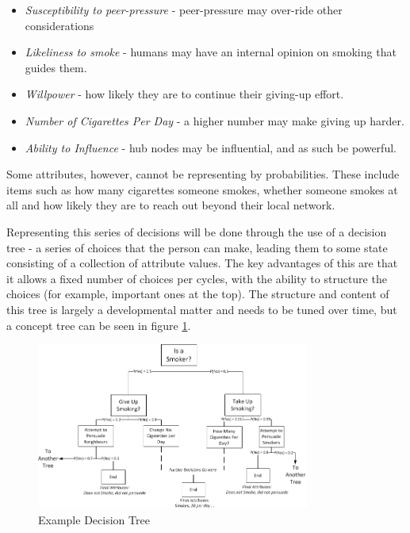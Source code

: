\documentclass[]{article}
\begin{document}
\begin{itemize}
\item \emph{Susceptibility to peer-pressure} - peer-pressure may over-ride other considerations
\item \emph{Likeliness to smoke} - humans may have an internal opinion on smoking that guides them.
\item \emph{Willpower} - how likely they are to continue their giving-up effort.
\item \emph{Number of Cigarettes Per Day} - a higher number may make giving up harder.
\item \emph{Ability to Influence} - hub nodes may be influential, and as such be powerful.
\end{itemize}

Some attributes, however, cannot be representing by probabilities. These include items such as how many cigarettes someone smokes, whether someone smokes at all and how likely they are to reach out beyond their local network.

Representing this series of decisions will be done through the use of a decision tree - a series of choices that the person can make, leading them to some state consisting of a collection of attribute values. The key advantages of this are that it allows a fixed number of choices per cycles, with the ability to structure the choices (for example, important ones at the top). The structure and content of this tree is largely a developmental matter and needs to be tuned over time, but a concept tree can be seen in figure \ref{fig:Sample decision tree}.


\begin{figure}
	\centering
		\includegraphics[width=0.80\textwidth]{sdt.jpg}
	\caption{Example Decision Tree}
	\label{fig:Sample decision tree}
\end{figure}
\end{document}
